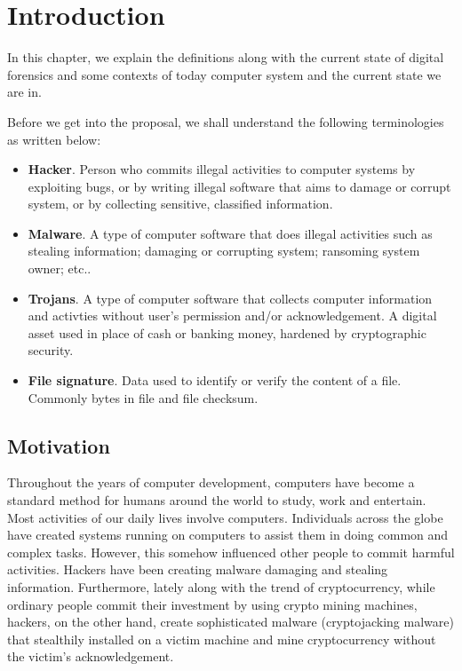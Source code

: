 \chapter[Introduction]{Introduction}

In this chapter, we explain the definitions along with the current state of digital forensics and some contexts of today computer system and the current state we are in.

Before we get into the proposal, we shall understand the following terminologies as written below:

\begin{itemize}
  \item \textbf{Hacker}.
    Person who commits illegal activities to computer systems by exploiting bugs, or by writing illegal software that aims to damage or corrupt system, or by collecting sensitive, classified information.
  \item \textbf{Malware}.
    A type of computer software that does illegal activities such as stealing information; damaging or corrupting system; ransoming system owner; etc..
  \item \textbf{Trojans}.
    A type of computer software that collects computer information and activties without user's permission and/or acknowledgement.
    A digital asset used in place of cash or banking money, hardened by cryptographic security.
  \item \textbf{File signature}.
    Data used to identify or verify the content of a file. Commonly bytes in file and file checksum.
\end{itemize}

\section[Motivation]{Motivation}

Throughout the years of computer development, computers have become a standard method for humans around the world to study, work and entertain. Most activities of our daily lives involve computers. Individuals across the globe have created systems running on computers to assist them in doing common and complex tasks. However, this somehow influenced other people to commit harmful activities. Hackers have been creating malware damaging and stealing information. Furthermore, lately along with the trend of cryptocurrency, while ordinary people commit their investment by using crypto mining machines, hackers, on the other hand, create sophisticated malware (cryptojacking malware) that stealthily installed on a victim machine and mine cryptocurrency without the victim's acknowledgement.

